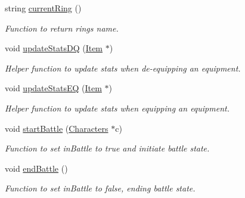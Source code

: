 \begin{DoxyCompactItemize}
string \hyperlink{class_characters_a02fd5bc3c6122b602d6aaf329a8cdaba}{current\+Ring} ()
\begin{DoxyCompactList}\small\item\em Function to return ring\textquotesingle{}s name. \end{DoxyCompactList}\item 
\hypertarget{class_characters_a0c8704124611ae8a358e26b584fede4e}{}\label{class_characters_a0c8704124611ae8a358e26b584fede4e} 
void \hyperlink{class_characters_a0c8704124611ae8a358e26b584fede4e}{update\+Stats\+DQ} (\hyperlink{class_item}{Item} $\ast$)
\begin{DoxyCompactList}\small\item\em Helper function to update stats when de-\/equipping an equipment. \end{DoxyCompactList}\item 
\hypertarget{class_characters_a1ba5a872f62151bad5874d6b36b8d141}{}\label{class_characters_a1ba5a872f62151bad5874d6b36b8d141} 
void \hyperlink{class_characters_a1ba5a872f62151bad5874d6b36b8d141}{update\+Stats\+EQ} (\hyperlink{class_item}{Item} $\ast$)
\begin{DoxyCompactList}\small\item\em Helper function to update stats when equipping an equipment. \end{DoxyCompactList}\item 
\hypertarget{class_characters_ac7e98c3ef453dad9f68b180438d27a0f}{}\label{class_characters_ac7e98c3ef453dad9f68b180438d27a0f} 
void \hyperlink{class_characters_ac7e98c3ef453dad9f68b180438d27a0f}{start\+Battle} (\hyperlink{class_characters}{Characters} $\ast$c)
\begin{DoxyCompactList}\small\item\em Function to set in\+Battle to true and initiate battle state. \end{DoxyCompactList}\item 
\hypertarget{class_characters_a115192e66e8bd958c49093e76208d17b}{}\label{class_characters_a115192e66e8bd958c49093e76208d17b} 
void \hyperlink{class_characters_a115192e66e8bd958c49093e76208d17b}{end\+Battle} ()
\begin{DoxyCompactList}\small\item\em Function to set in\+Battle to false, ending battle state. \end{DoxyCompactList}\item 
\hypertarget{class_characters_a7b8da28aa1fca4191bf181f6f10ddb23}{}\label{class_characters_a7b8da28aa1fca4191bf181f6f10ddb23} 

\end{DoxyCompactItemize}
